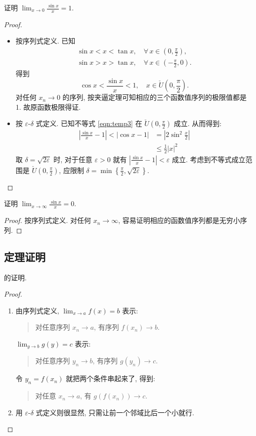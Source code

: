 \documentclass{book}
\newcommand{\Any}{\forall\,}
\newcommand{\set}[1]{\left\{#1\right\}}
\newcommand{\abs}[1]{\left\lvert #1 \right\rvert}
\newcommand{\puncU}[1]{\check{U}\!\left( #1 \right)}
\renewcommand{\le}{\leqslant}
\numberwithin{equation}{section}
\numberwithin{figure}{section}
\theoremstyle{definition}
\begin{document}
证明 $\lim_{x\to 0}\frac{\sin x}{x}=1$.
\begin{proof}
  \leavevmode

  \begin{itemize}
    \item 
  按序列式定义.
  已知
  \begin{gather*}
    \sin x<x<\tan x,\quad\Any x\in\left( 0,\frac{\pi}{2} \right),\\
    \sin x>x>\tan x,\quad\Any x\in\left( -\frac{\pi}{2},0 \right).
  \end{gather*}
  得到
  \begin{equation}
    \cos x<\frac{\sin x}{x}<1,\quad x\in\puncU{0,\frac{\pi}{2}}.
    \label{eqn:temp3}
  \end{equation}
  对任何 $x_n\to 0$ 的序列, 按夹逼定理可知相应的三个函数值序列的极限值都是 1.
  故原函数极限得证.
    \item 
      按 $\varepsilon$-$\delta$ 式定义.
      已知不等式 \eqref{eqn:temp3} 在 $\puncU{0,\frac{\pi}{2}}$ 成立.
      从而得到:
      \begin{align*}
	\abs{\frac{\sin x}{x}-1}<\abs{\cos x-1}&=\abs{2\sin^2\frac{x}{2}}\\
	&\le\frac{1}{2}\abs{x}^2
      \end{align*}
      取 $\delta=\sqrt{2\varepsilon}$ 时, 对于任意 $\varepsilon>0$ 就有 $\abs{\frac{\sin x}{x}-1}<\varepsilon$ 成立.
      考虑到不等式成立范围是 $\puncU{0,\frac{\pi}{2}}$, 应限制 $\delta=\min\set{{\frac{\pi}{2},\sqrt{2\varepsilon}}}$.
  \end{itemize}
\end{proof}

证明 $\lim_{x\to \infty}\frac{\sin x}{x}=0$.
\begin{proof}
  按序列式定义.
  对任何 $x_n\to \infty$, 容易证明相应的函数值序列都是无穷小序列.
\end{proof}

\subsection{定理证明}
 的\hypertarget{proof:CompositeFunctionLimit}{证明}.
\begin{proof}
  \leavevmode
  \begin{enumerate}
    \item 由序列式定义, $\lim_{x\to a}f(x)=b$ 表示:
      \begin{quote}
	对任意序列 $x_n\to a$, 有序列 $f(x_n)\to b$.
      \end{quote}
      $\lim_{y\to b}g(y)=c$ 表示:
      \begin{quote}
	对任意序列 $y_n\to b$, 有序列 $g(y_n)\to c$.
      \end{quote}
      令 $y_n=f(x_n)$ 就把两个条件串起来了, 得到:
      \begin{quote}
	对任意 $x_n\to a$, 有 $g(f(x_n))\to c$.
      \end{quote}
    \item 用 $\varepsilon$-$\delta$ 式定义则很显然, 只需让前一个邻域比后一个小就行.
  \end{enumerate}
\end{proof}
\end{document}
